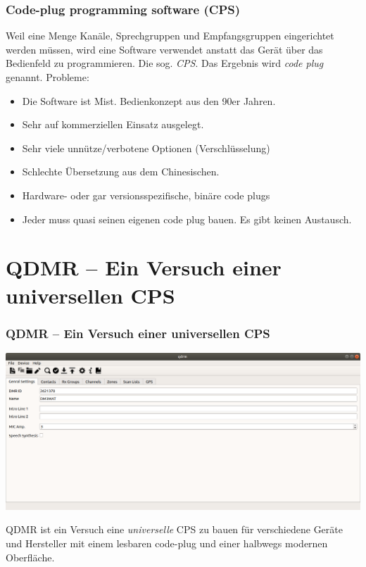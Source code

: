 \documentclass[aspectratio=169]{beamer}
\begin{document}
\begin{frame} \frametitle{Code-plug programming software (CPS)}
 Weil eine Menge Kanäle, Sprechgruppen und Empfangsgruppen eingerichtet werden müssen, wird eine Software verwendet anstatt das Gerät über das Bedienfeld zu programmieren. Die sog. \emph{CPS}. Das Ergebnis wird \emph{code plug} genannt. 
 \vspace{0.5cm} 
 Probleme:
 \begin{itemize}
  \item Die Software ist Mist. Bedienkonzept aus den 90er Jahren.
  \item Sehr auf kommerziellen Einsatz ausgelegt. 
  \item Sehr viele unnütze/verbotene Optionen (Verschlüsselung)
  \item Schlechte Übersetzung aus dem Chinesischen.
  \item Hardware- oder gar versionsspezifische, binäre code plugs 
  \item Jeder muss quasi seinen eigenen code plug bauen. Es gibt keinen Austausch.
 \end{itemize}
\end{frame}

\section{QDMR -- Ein Versuch einer universellen CPS}
\begin{frame} \frametitle{QDMR -- Ein Versuch einer universellen CPS}
\begin{center}
 \includegraphics[width=0.75\linewidth]{../fig/qdmr-general-settings.png}
\end{center}
QDMR ist ein Versuch eine \emph{universelle} CPS zu bauen für verschiedene Geräte und Hersteller mit einem lesbaren code-plug und einer halbwegs modernen Oberfläche.
\end{frame}
\end{document}
